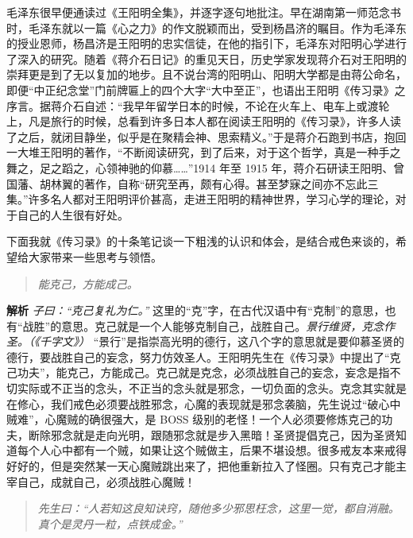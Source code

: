 毛泽东很早便通读过《王阳明全集》，并逐字逐句地批注。早在湖南第一师范念书时，毛泽东就以一篇《心之力》的作文脱颖而出，受到杨昌济的瞩目。作为毛泽东的授业恩师，杨昌济是王阳明的忠实信徒，在他的指引下，毛泽东对阳明心学进行了深入的研究。随着《蒋介石日记》的重见天日，历史学家发现蒋介石对王阳明的崇拜更是到了无以复加的地步。且不说台湾的阳明山、阳明大学都是由蒋公命名，即便“中正纪念堂”门前牌匾上的四个大字“大中至正”，也语出王阳明《传习录》之序言。据蒋介石自述：“我早年留学日本的时候，不论在火车上、电车上或渡轮上，凡是旅行的时候，总看到许多日本人都在阅读王阳明的《传习录》，许多人读了之后，就闭目静坐，似乎是在聚精会神、思索精义。”于是蒋介石跑到书店，抱回一大堆王阳明的著作，“不断阅读研究，到了后来，对于这个哲学，真是一种手之舞之，足之蹈之，心领神驰的仰慕……”1914 年至 1915 年，蒋介石研读王阳明、曾国藩、胡林翼的著作，自称“研究至再，颇有心得。甚至梦寐之间亦不忘此三集。”许多名人都对王阳明评价甚高，走进王阳明的精神世界，学习心学的理论，对于自己的人生很有好处。

下面我就《传习录》的十条笔记谈一下粗浅的认识和体会，是结合戒色来谈的，希望给大家带来一些思考与领悟。

\begin{quote}\it
    能克己，方能成己。
\end{quote}

\textbf{解析} \textit{子曰：“克己复礼为仁。”} 这里的“克”字，在古代汉语中有“克制”的意思，也有“战胜”的意思。克己就是一个人能够克制自己，战胜自己。\textit{景行维贤，克念作圣。（《千字文》）} “景行”是指崇高光明的德行，这八个字的意思就是要仰慕圣贤的德行，要战胜自己的妄念，努力仿效圣人。王阳明先生在《传习录》中提出了“克己功夫”，能克己，方能成己。克己就是克念，必须战胜自己的妄念，妄念是指不切实际或不正当的念头，不正当的念头就是邪念，一切负面的念头。克念其实就是在修心，我们戒色必须要战胜邪念，心魔的表现就是邪念袭脑，先生说过“破心中贼难”，心魔贼的确很强大，是 BOSS 级别的老怪！一个人必须要修炼克己的功夫，断除邪念就是走向光明，跟随邪念就是步入黑暗！圣贤提倡克己，因为圣贤知道每个人心中都有一个贼，如果让这个贼做主，后果不堪设想。很多戒友本来戒得好好的，但是突然某一天心魔贼跳出来了，把他重新拉入了怪圈。只有克己才能主宰自己，成就自己，必须战胜心魔贼！

\begin{quote}\it
    先生曰：“人若知这良知诀窍，随他多少邪思枉念，这里一觉，都自消融。真个是灵丹一粒，点铁成金。”
\end{quote}

